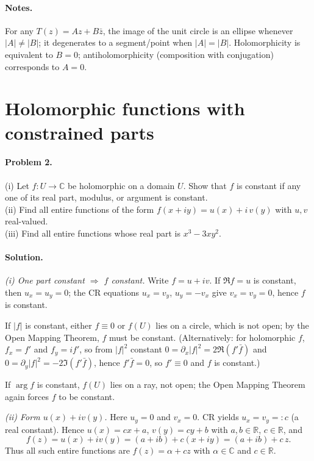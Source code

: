 \documentclass[11pt,a4paper]{article}
\theoremstyle{definition}
\theoremstyle{definition}
\theoremstyle{plain}
\theoremstyle{remark}
\begin{document}
\paragraph{Notes.}
For any $T(z)=Az+B\bar z$, the image of the unit circle is an ellipse whenever $|A|\neq|B|$; it degenerates to a segment/point when $|A|=|B|$.
Holomorphicity is equivalent to $B=0$; antiholomorphicity (composition with conjugation) corresponds to $A=0$.
	

\section*{Holomorphic functions with constrained parts}

\paragraph{Problem 2.}
(i) Let $f:U\to\mathbb C$ be holomorphic on a domain $U$. Show that $f$ is constant if any one of its real part, modulus, or argument is constant.\\
(ii) Find all entire functions of the form $f(x+iy)=u(x)+i\,v(y)$ with $u,v$ real-valued.\\
(iii) Find all entire functions whose real part is $x^3-3xy^2$.

\paragraph{Solution.}

\emph{(i) One part constant $\Rightarrow$ $f$ constant.}
Write $f=u+iv$.
If $\Re f=u$ is constant, then $u_x=u_y=0$; the CR equations $u_x=v_y$, $u_y=-v_x$ give $v_x=v_y=0$, hence $f$ is constant.

If $|f|$ is constant, either $f\equiv0$ or $f(U)$ lies on a circle, which is not open; by the Open Mapping Theorem, $f$ must be constant.
(Alternatively: for holomorphic $f$, $f_x=f'$ and $f_y=i f'$, so from $|f|^2$ constant
$0=\partial_x|f|^2=2\Re(f'\bar f)$ and $0=\partial_y|f|^2=-2\Im(f'\bar f)$, hence $f'\bar f=0$, so $f'\equiv0$ and $f$ is constant.)

If $\arg f$ is constant, $f(U)$ lies on a ray, not open; the Open Mapping Theorem again forces $f$ to be constant.

\medskip
\emph{(ii) Form $u(x)+i v(y)$.}
Here $u_y=0$ and $v_x=0$. CR yields $u_x=v_y=:c$ (a real constant). Hence
$u(x)=cx+a$, $v(y)=cy+b$ with $a,b\in\mathbb R$, $c\in\mathbb R$, and
\[
f(z)=u(x)+i v(y)=(a+ib)+c(x+iy)=(a+ib)+c\,z.
\]
Thus all such entire functions are $f(z)=\alpha + c z$ with $\alpha\in\mathbb C$ and $c\in\mathbb R$.
\end{document}
